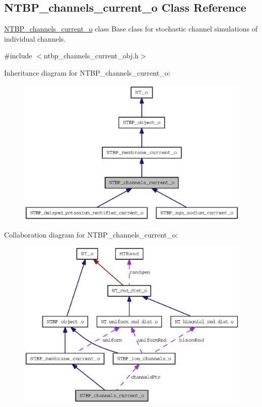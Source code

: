 \subsection{NTBP\_\-channels\_\-current\_\-o Class Reference}
\label{class_n_t_b_p__channels__current__o}


\hyperlink{class_n_t_b_p__channels__current__o}{NTBP\_\-channels\_\-current\_\-o} class Base class for stochastic channel simulations of individual channels.  




{\ttfamily \#include $<$ntbp\_\-channels\_\-current\_\-obj.h$>$}



Inheritance diagram for NTBP\_\-channels\_\-current\_\-o:
\nopagebreak
\begin{figure}[H]
\begin{center}
\leavevmode
\includegraphics[width=400pt]{class_n_t_b_p__channels__current__o__inherit__graph}
\end{center}
\end{figure}


Collaboration diagram for NTBP\_\-channels\_\-current\_\-o:
\nopagebreak
\begin{figure}[H]
\begin{center}
\leavevmode
\includegraphics[width=400pt]{class_n_t_b_p__channels__current__o__coll__graph}
\end{center}
\end{figure}
